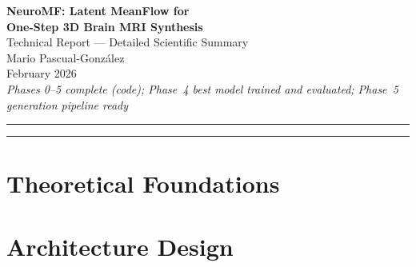 \documentclass[11pt,a4paper]{article}
\begin{document}
\begin{center}
  {\LARGE\bfseries NeuroMF: Latent MeanFlow for\\[4pt] One-Step 3D Brain MRI Synthesis}\\[18pt]
  {\large Technical Report --- Detailed Scientific Summary}\\[12pt]
  {\large Mario Pascual-Gonz\'{a}lez}\\[6pt]
  {\normalsize February 2026}\\[6pt]
  {\small\itshape Phases 0--5 complete (code); Phase~4 best model trained and evaluated;
  Phase~5 generation pipeline ready}
\end{center}

\vspace{1em}
\hrule
\vspace{0.5em}

\tableofcontents

\vspace{1em}
\hrule
\newpage




\section{Theoretical Foundations}
\label{sec:theory}




















\section{Architecture Design}
\label{sec:architecture}
\end{document}
